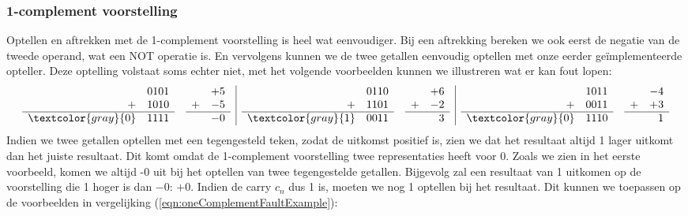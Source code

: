 \subsubsection{1-complement voorstelling}
Optellen en aftrekken met de 1-complement voorstelling is heel wat eenvoudiger. Bij een aftrekking bereken we ook eerst de negatie van de tweede operand, wat een NOT operatie is. En vervolgens kunnen we de twee getallen eenvoudig optellen met onze eerder ge\"implementeerde opteller. Deze optelling volstaat soms echter niet, met het volgende voorbeelden kunnen we illustreren wat er kan fout lopen:
\begin{equation}
\begin{array}{rl|rl|rl}
\begin{array}{rr}
&0101\\
+&1010\\\hline
\textcolor{gray}{0}&1111
\end{array}
&
\begin{array}{rr}
&+5\\
+&-5\\\hline
&-0
\end{array}
&
\begin{array}{rr}
&0110\\
+&1101\\\hline
\textcolor{gray}{1}&0011
\end{array}
&
\begin{array}{rr}
&+6\\
+&-2\\\hline
&3
\end{array}
&
\begin{array}{rr}
&1011\\
+&0011\\\hline
\textcolor{gray}{0}&1110
\end{array}
&
\begin{array}{rr}
&-4\\
+&+3\\\hline
&1
\end{array}
\end{array}
\label{eqn:oneComplementFaultExample}
\end{equation}
Indien we twee getallen optellen met een tegengesteld teken, zodat de uitkomst positief is, zien we dat het resultaat altijd 1 lager uitkomt dan het juiste resultaat. Dit komt omdat de 1-complement voorstelling twee representaties heeft voor 0. Zoals we zien in het eerste voorbeeld, komen we altijd -0 uit bij het optellen van twee tegengestelde getallen. Bijgevolg zal een resultaat van 1 uitkomen op de voorstelling die 1 hoger is dan $-0$: $+0$. Indien de carry $c_n$ dus 1 is, moeten we nog 1 optellen bij het resultaat. Dit kunnen we toepassen op de voorbeelden in vergelijking (\ref{eqn:oneComplementFaultExample}):
